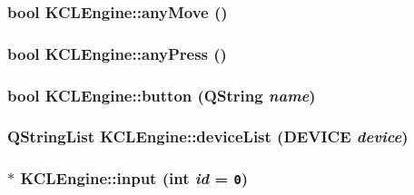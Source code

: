 \hypertarget{class_k_c_l_engine_1dd1ac1227dc51b3244205cf40ab105a}{
\subsubsection[{anyMove}]{\setlength{\rightskip}{0pt plus 5cm}bool KCLEngine::anyMove ()}}
\label{class_k_c_l_engine_1dd1ac1227dc51b3244205cf40ab105a}


\hypertarget{class_k_c_l_engine_aff35dae398c148743797b774d14647a}{
\subsubsection[{anyPress}]{\setlength{\rightskip}{0pt plus 5cm}bool KCLEngine::anyPress ()}}
\label{class_k_c_l_engine_aff35dae398c148743797b774d14647a}


\hypertarget{class_k_c_l_engine_0bcbf5200cdbf84b6e73b804e5064836}{
\subsubsection[{button}]{\setlength{\rightskip}{0pt plus 5cm}bool KCLEngine::button (QString {\em name})}}
\label{class_k_c_l_engine_0bcbf5200cdbf84b6e73b804e5064836}


\hypertarget{class_k_c_l_engine_7b3834bd74520513874137bb785c027f}{
\subsubsection[{deviceList}]{\setlength{\rightskip}{0pt plus 5cm}QStringList KCLEngine::deviceList ({\bf DEVICE} {\em device})}}
\label{class_k_c_l_engine_7b3834bd74520513874137bb785c027f}


\hypertarget{class_k_c_l_engine_7e4af493818ecd2095325fe28d8db227}{
\subsubsection[{input}]{$\ast$ KCLEngine::input (int {\em id} = {\tt 0})}}
\label{class_k_c_l_engine_7e4af493818ecd2095325fe28d8db227}


